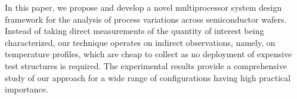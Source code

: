In this paper, we propose and develop a novel multiprocessor system design framework for the analysis of process variations across semiconductor wafers. Instead of taking direct measurements of the quantity of interest being characterized, our technique operates on indirect observations, namely, on temperature profiles, which are cheap to collect as no deployment of expensive test structures is required.
The experimental results provide a comprehensive study of our approach for a wide range of configurations having high practical importance.
